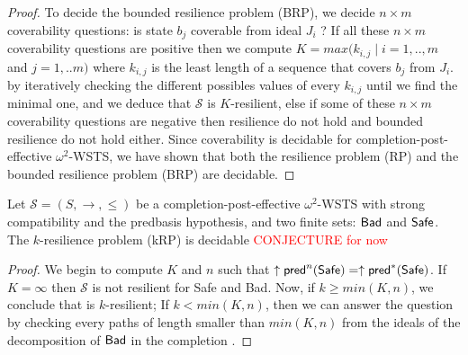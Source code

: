 \begin{proof}
To decide the  bounded resilience problem (BRP), we decide $n \times m$ coverability questions: is state $b_j$ coverable from ideal $J_i$ ? If all these $n \times m$ coverability questions are positive then we compute $K=max(k_{i,j} \mid i=1,..,m $ and $j= 1,..m)$ where $k_{i,j}$ is the least length of a sequence that covers  $b_j$ from $J_i$.
 by iteratively checking the different possibles values of every $k_{i,j}$ until we find the minimal one,
 and we deduce that  $\mathscr{S}$ is $K$-resilient,
else if some of these $n \times m$ coverability questions are negative then resilience
do not hold and bounded resilience do not hold either.
 Since coverability is decidable for completion-post-effective $\omega^2$-WSTS, we have shown that both the 
  resilience problem (RP) and the  
  bounded resilience problem (BRP) are decidable.
\end{proof}


\begin{theorem}\label{k-down-up}
Let $\mathscr{S}=(S,\rightarrow, \leq)$ be a completion-post-effective $\omega^2$-WSTS with strong compatibility and the predbasis hypothesis, and two finite sets: $\textsf{Bad}$ and $\textsf{Safe}$.
The  $k$-resilience problem (kRP) is decidable 
\textcolor{red}{CONJECTURE for now}
 \end{theorem}

\begin{proof}
We begin to compute $K$ and $n$ such that $ \uparrow \textsf{pred}^n(\textsf{Safe})=  \uparrow \textsf{pred}^*(\textsf{Safe})$.
If $K=\infty$ then $\mathscr{S}$ is not resilient for Safe and Bad.
Now, if $k \geq min(K,n)$, we conclude that is $k$-resilient; 
	If $k <  min(K,n)$, then we can answer the question by checking every paths of length smaller
	than $min(K,n)$ from the ideals of the decomposition of $\textsf{Bad}$ in the completion .
\end{proof}

